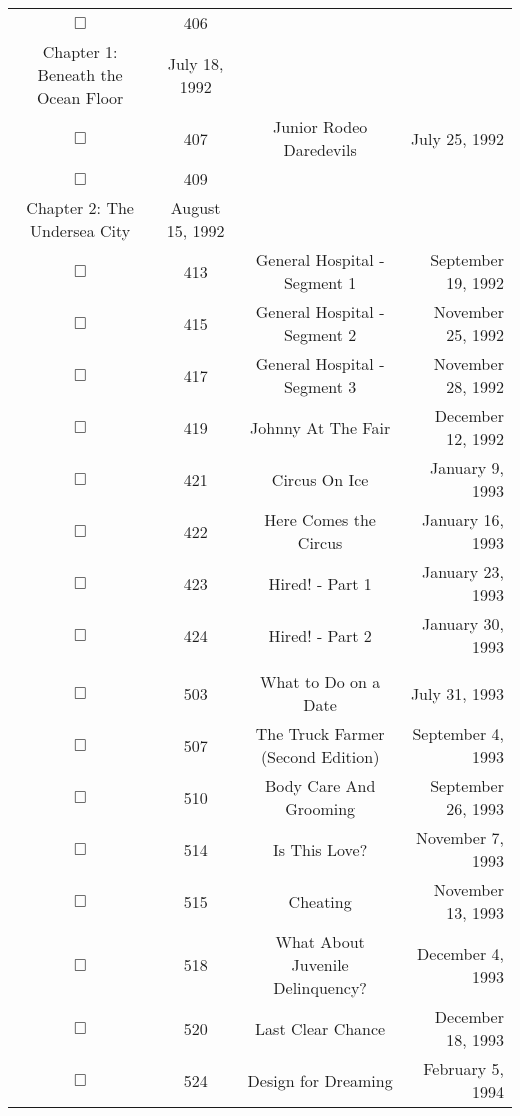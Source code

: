 \documentclass[12pt]{article}
\begin{document}
\begin{center}
\begin{longtable}[c]{cccr}
\\  %
$\Box$&406&\begin{tabular}{@{}c@{}}Undersea Kingdom\\Chapter 1: Beneath the Ocean Floor\end{tabular}&July 18, 1992\\
$\Box$&407&Junior Rodeo Daredevils&July 25, 1992\\
$\Box$&409&\begin{tabular}{@{}c@{}}Undersea Kingdom\\Chapter 2: The Undersea City\end{tabular}&August 15, 1992\\
$\Box$&413&General Hospital - Segment 1&September 19, 1992\\
$\Box$&415&General Hospital - Segment 2&November 25, 1992\\
$\Box$&417&General Hospital - Segment 3&November 28, 1992\\
$\Box$&419&Johnny At The Fair&December 12, 1992\\
$\Box$&421&Circus On Ice&January 9, 1993\\
$\Box$&422&Here Comes the Circus&January 16, 1993\\
$\Box$&423&Hired! - Part 1&January 23, 1993\\
$\Box$&424&Hired! - Part 2&January 30, 1993\\

\\  %
$\Box$&503&What to Do on a Date&July 31, 1993\\
$\Box$&507&The Truck Farmer (Second Edition)&September 4, 1993\\
$\Box$&510&Body Care And Grooming&September 26, 1993\\
$\Box$&514&Is This Love?&November 7, 1993\\
$\Box$&515&Cheating&November 13, 1993\\
$\Box$&518&What About Juvenile Delinquency?&December 4, 1993\\
$\Box$&520&Last Clear Chance&December 18, 1993\\
$\Box$&524&Design for Dreaming&February 5, 1994\\


\end{longtable}
\end{center}
\end{document}
